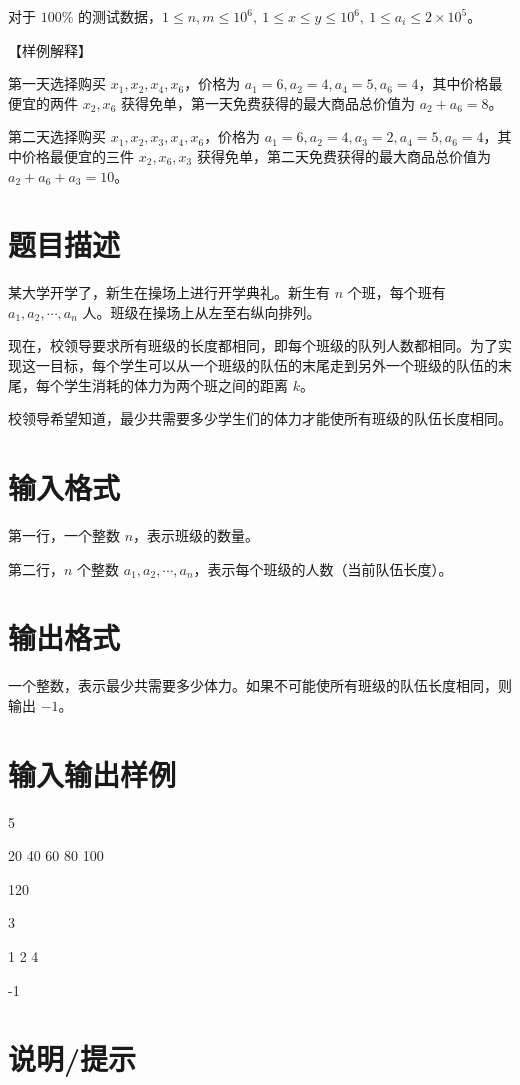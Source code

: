 \documentclass{../cpct/ctpro}
\begin{document}
对于 $100 \%$ 的测试数据，$1 \leq n,m \leq {10}^{6},~1 \leq x \leq y \leq {10}^{6},~1 \leq a_i \leq 2 \times {10}^5$。

【样例解释】

第一天选择购买 $x_1,x_2,x_4,x_6$，价格为 $a_1=6,a_2=4,a_4=5,a_6=4$，其中价格最便宜的两件 $x_2,x_6$ 获得免单，第一天免费获得的最大商品总价值为 $a_2+a_6=8$。

第二天选择购买 $x_1,x_2,x_3,x_4,x_6$，价格为 $a_1=6,a_2=4,a_3=2,a_4=5,a_6=4$，其中价格最便宜的三件 $x_2,x_6,x_3$ 获得免单，第二天免费获得的最大商品总价值为 $a_2+a_6+a_3=10$。

\makeproblem
\section*{题目描述}

某大学开学了，新生在操场上进行开学典礼。新生有 $n$ 个班，每个班有 $a_1,a_2,\cdots,a_n$ 人。班级在操场上从左至右纵向排列。

现在，校领导要求所有班级的长度都相同，即每个班级的队列人数都相同。为了实现这一目标，每个学生可以从一个班级的队伍的末尾走到另外一个班级的队伍的末尾，每个学生消耗的体力为两个班之间的距离 $k$。

校领导希望知道，最少共需要多少学生们的体力才能使所有班级的队伍长度相同。

\section*{输入格式}

第一行，一个整数 $n$，表示班级的数量。

第二行，$n$ 个整数 $a_1,a_2,\cdots,a_n$，表示每个班级的人数（当前队伍长度）。

\section*{输出格式}

一个整数，表示最少共需要多少体力。如果不可能使所有班级的队伍长度相同，则输出 $-1$。

\section*{输入输出样例}
\testcasetab
{
    5 \par
    20 40 60 80 100
}
{
    120
}

\testcasetab
{
    3 \par
    1 2 4
}
{
    -1
}

\section*{说明/提示}
\end{document}
